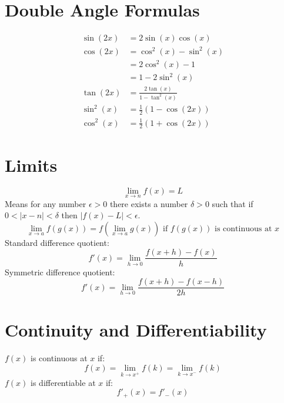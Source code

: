 \documentclass[12pt]{article}
\newenvironment{rmbskip}{\setlength{\belowdisplayskip}{0pt}\ignorespaces}%
  {\ignorespacesafterend}
\newenvironment{rmskip}{\setlength{\abovedisplayskip}{0pt}%
  \setlength{\belowdisplayskip}{0pt}\ignorespaces}%
  {\ignorespacesafterend}
\begin{document}
\section*{Double Angle Formulas}
\begin{rmskip}
  \begin{align*}
    \sin(2x) &= 2\sin(x)\cos(x)\\
    \cos(2x) &= \cos^2(x) - \sin^2(x)\\
      &= 2\cos^2(x) - 1\\
      &= 1-2\sin^2(x)\\
    \tan(2x) &= \frac{2\tan(x)}{1 - \tan^2(x)}\\
    \sin^2(x) &= \frac{1}{2}(1-\cos(2x))\\
    \cos^2(x) &= \frac{1}{2}(1+\cos(2x))
  \end{align*}
\end{rmskip}
\section*{Limits}
\[
  \lim_{x \to n} f(x) = L
\]
Means for any number \(\epsilon > 0\) there exists a number \(\delta > 0\) such
that if \(0 < |x - n| < \delta\) then \(|f(x) - L| < \epsilon\).
\[
  \lim_{x \to a}f(g(x)) = f\left(\lim_{x \to a}g(x)\right) \text{ if } f(g(x))
  \text{ is continuous at } x
\]
Standard difference quotient:
\[
  f'(x) = \lim_{h \to 0}\frac{f(x+h) - f(x)}{h}
\]
Symmetric difference quotient:
\begin{rmbskip}
  \[
    f'(x) = \lim_{h \to 0}\frac{f(x+h) - f(x-h)}{2h}
  \]
\end{rmbskip}
\section*{Continuity and Differentiability}
\(f(x)\) is continuous at \(x\) if:
\[
  f(x) = \lim_{k \to x^+}f(k) = \lim_{k \to x^-}f(k)
\]
\(f(x)\) is differentiable at \(x\) if:
\begin{rmbskip}
  \[
    f'_+(x) = f'_-(x)
  \]
\end{rmbskip}
\end{document}
